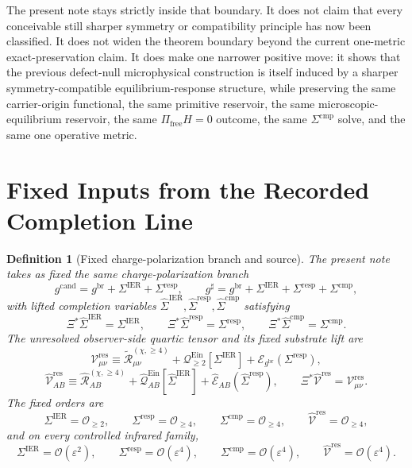 \documentclass[11pt]{article}
\newcommand{\ObserverMap}{\Xi}
\newcommand{\ObserverMetric}{g^{\mathrm{br}}}
\newcommand{\CandidateMetric}{g^{\mathrm{cand}}}
\newcommand{\CompletedMetric}{g^{\sharp}}
\newcommand{\BaseShift}{\Sigma^{\mathrm{IER}}}
\newcommand{\ResponseShift}{\Sigma^{\mathrm{resp}}}
\newcommand{\CompShift}{\Sigma^{\mathrm{cmp}}}
\newcommand{\BaseLift}{\widehat\Sigma^{\mathrm{IER}}}
\newcommand{\ResponseLift}{\widehat\Sigma^{\mathrm{resp}}}
\newcommand{\CompLift}{\widehat\Sigma^{\mathrm{cmp}}}
\newcommand{\ReLongFour}{\widetilde{\mathcal R}_{\mu\nu}^{(\chi,\ge 4)}}
\newcommand{\ResidualCore}{\mathcal V_{\mu\nu}^{\mathrm{res}}}
\newcommand{\ResidualLift}{\widehat{\mathcal V}^{\mathrm{res}}}
\newcommand{\EinLin}{\mathcal E_{\ObserverMetric}}
\newcommand{\EinQuad}{\mathcal Q_{\ge 2}^{\mathrm{Ein}}}
\newcommand{\epsIR}{\varepsilon}
\newtheorem{definition}{Definition}
\begin{document}
The present note stays strictly inside that boundary. It does not claim that every conceivable still sharper symmetry or compatibility principle has now been classified. It does not widen the theorem boundary beyond the current one-metric exact-preservation claim. It does make one narrower positive move: it shows that the previous defect-null microphysical construction is itself induced by a sharper symmetry-compatible equilibrium-response structure, while preserving the same carrier-origin functional, the same primitive reservoir, the same microscopic-equilibrium reservoir, the same \(\Pi_{\mathrm{free}}H=0\) outcome, the same \(\Sigma^{\mathrm{cmp}}\) solve, and the same one operative metric.

\section{Fixed Inputs from the Recorded Completion Line}

\begin{definition}[Fixed charge-polarization branch and source]
\label{def:fixed}
The present note takes as fixed the same charge-polarization branch
\begin{equation}
\CandidateMetric
=
\ObserverMetric+\BaseShift+\ResponseShift,
\qquad
\CompletedMetric
=
\ObserverMetric+\BaseShift+\ResponseShift+\CompShift,
\label{eq:metrics}
\end{equation}
with lifted completion variables \(\BaseLift,\ResponseLift,\CompLift\) satisfying
\begin{equation}
\ObserverMap^*\BaseLift=\BaseShift,
\qquad
\ObserverMap^*\ResponseLift=\ResponseShift,
\qquad
\ObserverMap^*\CompLift=\CompShift.
\label{eq:lifts}
\end{equation}
The unresolved observer-side quartic tensor and its fixed substrate lift are
\begin{equation}
\ResidualCore
\equiv
\ReLongFour
+\EinQuad[\BaseShift]
+\EinLin(\ResponseShift),
\label{eq:vres}
\end{equation}
\begin{equation}
\ResidualLift_{AB}
\equiv
\widehat{\mathcal R}_{AB}^{(\chi,\ge 4)}
+\widehat{\mathcal Q}_{AB}^{\mathrm{Ein}}[\BaseLift]
+\widehat{\mathcal E}_{AB}(\ResponseLift),
\qquad
\ObserverMap^*\ResidualLift=\ResidualCore.
\label{eq:liftedsource}
\end{equation}
The fixed orders are
\begin{equation}
\BaseShift=\mathcal O_{\ge 2},
\qquad
\ResponseShift=\mathcal O_{\ge 4},
\qquad
\CompShift=\mathcal O_{\ge 4},
\qquad
\ResidualLift=\mathcal O_{\ge 4},
\label{eq:orders}
\end{equation}
and on every controlled infrared family,
\begin{equation}
\BaseShift=\mathcal O(\epsIR^2),
\qquad
\ResponseShift=\mathcal O(\epsIR^4),
\qquad
\CompShift=\mathcal O(\epsIR^4),
\qquad
\ResidualLift=\mathcal O(\epsIR^4).
\label{eq:irorders}
\end{equation}
\end{definition}
\end{document}
